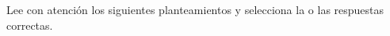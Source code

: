 Lee con atención los siguientes planteamientos y selecciona la o las respuestas correctas.

\begin{multicols}{2}
    \begin{parts}
        \part  
        \part  
        \part  
        \part  
        \columnbreak
        \part  
        \part  
        \part  
    \end{parts}
\end{multicols}